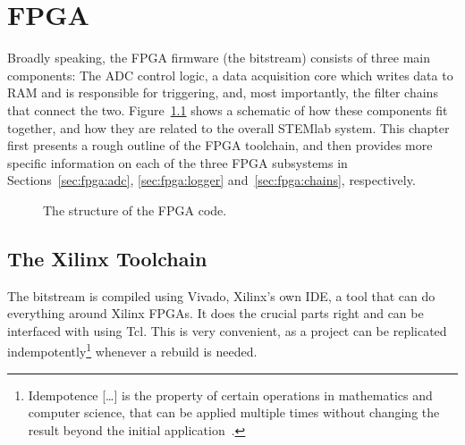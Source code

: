 %
%
\chapter{FPGA} %
\label{ch:fpga}
%
%
Broadly speaking,  the FPGA  firmware (the bitstream)  consists of  three main
components:  The ADC control logic, a  data acquisition core which writes data
to  RAM  and  is  responsible  for  triggering,  and,  most  importantly,  the
filter chains  that connect the two.   Figure~\ref{fig:fpga:structure} shows a
schematic of  how these components fit  together, and how they  are related to
the overall STEMlab system. This chapter first presents a rough outline of the
FPGA toolchain,  and then provides  more specific  information on each  of the
three  FPGA subsystems  in Sections~\ref{sec:fpga:adc},  \ref{sec:fpga:logger}
and~\ref{sec:fpga:chains}, respectively.

\begin{figure}
    \centering
    
    \caption{The structure of the FPGA code.}
    \label{fig:fpga:structure}
\end{figure}
%
%
\section{The Xilinx Toolchain} %
\label{sec:fpga:toolchain}

The bitstream is compiled  using Vivado, Xilinx's own IDE, a  tool that can do
everything around  Xilinx FPGAs. It does  the crucial  parts right and  can be
interfaced  with using  Tcl. This  is very  convenient, as  a  project can  be
replicated indempotently\footnote{%
    Idempotence [\ldots] is the property  of certain operations in mathematics
    and computer science, that can  be applied multiple times without changing
    the result beyond the initial application~\cite{wiki:idempotence}.%
}%
whenever a rebuild is needed.

